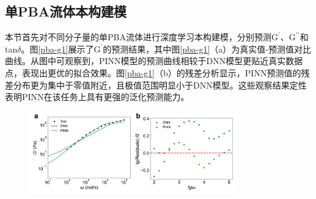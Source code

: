 \subsection{单PBA流体本构建模}
本节首先对不同分子量的单PBA流体进行深度学习本构建模，分别预测$\mathrm{G^{\prime}}$、$\mathrm{G^{\prime\prime}}$和tan$\delta$。图\ref{pba-g1}展示了$\mathrm{G^{\prime}}$的预测结果，其中图\ref{pba-g1}（a）为真实值-预测值对比曲线。从图中可观察到，PINN模型的预测曲线相较于DNN模型更贴近真实数据点，表现出更优的拟合效果。图\ref{pba-g1}（b）的残差分析显示，PINN预测值的残差分布更为集中于零值附近，且极值范围明显小于DNN模型。这些观察结果定性表明PINN在该任务上具有更强的泛化预测能力。
\begin{figure}[htbp]
  \centering
  \includegraphics[width=0.8\textwidth]{Fig/pba-g1.pdf}
\end{figure}

